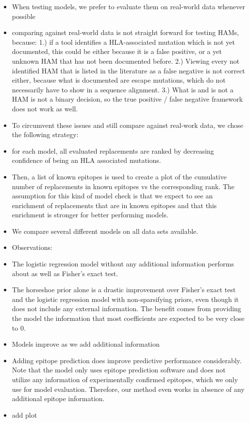 \documentclass[fleqn,11pt]{SelfArx} %
\begin{document}
\begin{itemize}
  \item When testing models, we prefer to evaluate them on real-world data whenever possible
  \item comparing against real-world data is not straight forward for testing HAMs, because: 1.) if a tool identifies a HLA-associated mutation which is not yet documented, this could be either because it is a false positive, or a yet unknown HAM that has not been documented before. 2.) Viewing every not identified HAM that is listed in the literature as a false negative is not correct either, because what is documented are escape mutations, which do not necessarily have to show in a sequence alignment. 3.) What is and is not a HAM is not a binary decision, so the true positive / false negative framework does not work as well.
  \item To circumvent these issues and still compare against real-work data, we chose the following strategy:
  \item for each model, all evaluated replacements are ranked by decreasing confidence of being an HLA associated mutations.
  \item Then, a list of known epitopes is used to create a plot of the cumulative number of replacements in known epitopes vs the corresponding rank. The assumption for this kind of model check is that we expect to see an 
  enrichment of replacements that are in known epitopes and that this enrichment is stronger for better performing models.
  \item We compare several different models on all data sets available. 
  \item Observations:
  \item The logistic regression model without any additional information performs about as well as Fisher's exact test.
  \item The horseshoe prior alone is a drastic improvement over Fisher's exact test and the logistic regression model with non-sparsifying priors, even though it does not include any external information. The benefit comes from providing the model the information that most coefficients are expected to be very close to 0.
  \item Models improve as we add additional information
  \item Adding epitope prediction does improve predictive performance considerably. Note that the model only uses epitope prediction software and does not utilize any information of experimentally confirmed epitopes, which we only use for model evaluation. Therefore, our method even works in absence of any additional epitope information.
  \item add plot
\end{itemize}
\end{document}
